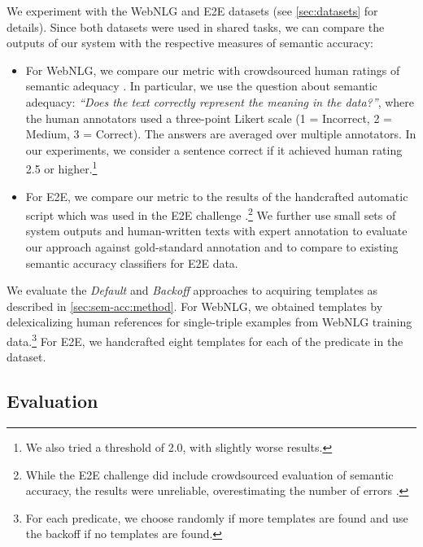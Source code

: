 We experiment with the WebNLG and E2E datasets (see \autoref{sec:datasets} for details). Since both datasets were used in shared tasks, we can compare the outputs of our system with the respective measures of semantic accuracy:
\begin{itemize}
    \item For WebNLG, we compare our metric with crowdsourced human ratings of semantic adequacy \cite{shimorinaWebNLGChallengeHuman2019}. In particular, we use the question about semantic adequacy: \textit{``Does the text correctly represent the meaning in the data?''}, where the human annotators used a three-point Likert scale (1 = Incorrect, 2 = Medium, 3 = Correct). The answers are averaged over multiple annotators. In our experiments, we consider a sentence correct if it achieved human rating 2.5 or higher.\footnote{We also tried a threshold of 2.0, with slightly worse results.}
    \item For E2E, we compare our metric to the results of the handcrafted automatic script which was used in the E2E challenge \cite{dusekEvaluatingStateoftheartEndtoEnd2020}.\footnote{While the E2E challenge did include crowdsourced evaluation of semantic accuracy, the results were unreliable, overestimating the number of errors \cite{dusekEvaluatingStateoftheartEndtoEnd2020}.} We further use small sets of system outputs and human-written texts with expert annotation \citep[provided by][]{dusekSemanticNoiseMatters2019} to evaluate our approach against gold-standard annotation and to compare to existing semantic accuracy classifiers for E2E data.
\end{itemize}


We evaluate the \emph{Default} and \emph{Backoff} approaches to acquiring templates as described in \autoref{sec:sem-acc:method}. For WebNLG, we obtained templates by delexicalizing human references for single-triple examples from WebNLG training data.\footnote{For each predicate, we choose randomly if more templates are found and use the backoff if no templates are found.} For E2E, we handcrafted eight templates for each of the predicate in the dataset.

\subsection{Evaluation}
\label{sec:sem-acc:evaluation}

